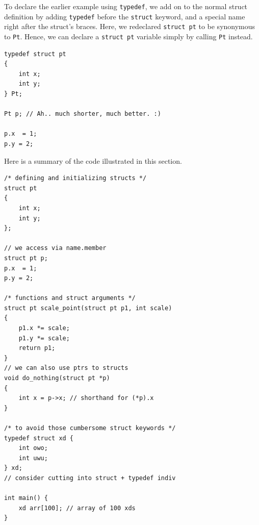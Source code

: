 To declare the earlier example using \verb|typedef|, we add on to the normal struct definition by adding \verb|typedef| before the \verb|struct| keyword, and a special name right after the struct's braces.
Here, we redeclared \verb|struct pt| to be synonymous to \verb|Pt|.
Hence, we can declare a \verb|struct pt| variable simply by calling \verb|Pt| instead.

\begin{verbatim}
typedef struct pt
{
    int x;
    int y;
} Pt;

Pt p; // Ah.. much shorter, much better. :)

p.x  = 1;
p.y = 2;
\end{verbatim}

Here is a summary of the code illustrated in this section.

\begin{verbatim}
/* defining and initializing structs */
struct pt
{
    int x;
    int y;
};

// we access via name.member
struct pt p;
p.x  = 1;
p.y = 2;

/* functions and struct arguments */
struct pt scale_point(struct pt p1, int scale)
{
    p1.x *= scale;
    p1.y *= scale;
    return p1;
}
// we can also use ptrs to structs
void do_nothing(struct pt *p)
{
    int x = p->x; // shorthand for (*p).x
}

/* to avoid those cumbersome struct keywords */
typedef struct xd {
    int owo;
    int uwu;
} xd;
// consider cutting into struct + typedef indiv

int main() {
    xd arr[100]; // array of 100 xds
}
\end{verbatim}